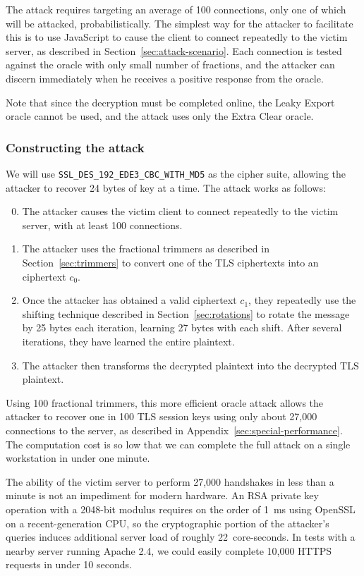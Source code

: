 The attack requires targeting
an average of 100 connections, only one of
which will be attacked, probabilistically.  The simplest
way for the attacker to facilitate this is to use JavaScript to cause
the client to connect repeatedly to the victim server, as described in
Section~\ref{sec:attack-scenario}.  Each connection is tested
against the oracle with only small number of fractions, and the attacker can discern
immediately when he receives a positive response from the oracle.

Note that since the decryption must be completed online, the Leaky Export oracle
cannot be used, and the attack uses only the Extra Clear oracle.

\subsubsection{Constructing the attack}
We will use \texttt{SSL\_DES\_192\_EDE3\_CBC\_WITH\_MD5} as the cipher suite, allowing the attacker to recover 24 bytes of key at a time.
The attack works as follows:

\begin{enumerate}
 \setcounter{enumi}{-1}
 \item The attacker causes the victim client to connect repeatedly to the
  victim server, with at least 100 connections.
 \item The attacker uses the fractional trimmers as described in
  Section~\ref{sec:trimmers} to convert one of the TLS ciphertexts
  into an \sslconform ciphertext $c_0$.
 \item Once the attacker has obtained a valid \ssltwo ciphertext $c_1$,
  they repeatedly use the shifting technique described in
  Section~\ref{sec:rotations} to rotate the message by 25 bytes each iteration,
  learning 27 bytes with each shift.  After several iterations, they have learned
  the entire plaintext.
 \item The attacker then transforms the decrypted \ssltwo plaintext into the decrypted TLS plaintext. 
\end{enumerate}

Using 100 fractional trimmers, this more efficient oracle attack allows
the attacker to recover one in 100 TLS session keys using only about
27,000 connections to the server, as described in
Appendix~\ref{sec:special-performance}.  The computation cost is so low that
we can complete the full attack on a single workstation in under one
minute.

\ifext
The ability of the victim server to perform 27,000 handshakes in less than a
minute is not an impediment for modern hardware.  An RSA
private key operation with a 2048-bit modulus requires on the order of
1~ms using OpenSSL on a recent-generation CPU, so the cryptographic
portion of the attacker's queries induces additional server load of
roughly 22~core-seconds.  In tests with a nearby server running Apache
2.4, we could easily complete 10,000 HTTPS requests in under 10
seconds.
\fi
